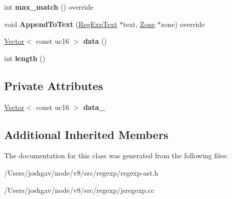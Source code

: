 \begin{DoxyCompactItemize}
\item 
int {\bfseries max\+\_\+match} () override\hypertarget{classv8_1_1internal_1_1_reg_exp_atom_ac030610f58e9dd3b4f26dbf6c4f599d7}{}\label{classv8_1_1internal_1_1_reg_exp_atom_ac030610f58e9dd3b4f26dbf6c4f599d7}

\item 
void {\bfseries Append\+To\+Text} (\hyperlink{classv8_1_1internal_1_1_reg_exp_text}{Reg\+Exp\+Text} $\ast$text, \hyperlink{classv8_1_1internal_1_1_zone}{Zone} $\ast$zone) override\hypertarget{classv8_1_1internal_1_1_reg_exp_atom_a7f46566fde6671d6e646caa80984e421}{}\label{classv8_1_1internal_1_1_reg_exp_atom_a7f46566fde6671d6e646caa80984e421}

\item 
\hyperlink{classv8_1_1internal_1_1_vector}{Vector}$<$ const uc16 $>$ {\bfseries data} ()\hypertarget{classv8_1_1internal_1_1_reg_exp_atom_ad5711a0a79d8952864b2d6fd61ab66c6}{}\label{classv8_1_1internal_1_1_reg_exp_atom_ad5711a0a79d8952864b2d6fd61ab66c6}

\item 
int {\bfseries length} ()\hypertarget{classv8_1_1internal_1_1_reg_exp_atom_a315e0291cf6e0b1487dfa2fe00dda91f}{}\label{classv8_1_1internal_1_1_reg_exp_atom_a315e0291cf6e0b1487dfa2fe00dda91f}

\end{DoxyCompactItemize}
\subsection*{Private Attributes}
\begin{DoxyCompactItemize}
\item 
\hyperlink{classv8_1_1internal_1_1_vector}{Vector}$<$ const uc16 $>$ {\bfseries data\+\_\+}\hypertarget{classv8_1_1internal_1_1_reg_exp_atom_a7e650f980216e353e13c01793bcf328e}{}\label{classv8_1_1internal_1_1_reg_exp_atom_a7e650f980216e353e13c01793bcf328e}

\end{DoxyCompactItemize}
\subsection*{Additional Inherited Members}


The documentation for this class was generated from the following files\+:\begin{DoxyCompactItemize}
\item 
/\+Users/joshgav/node/v8/src/regexp/regexp-\/ast.\+h\item 
/\+Users/joshgav/node/v8/src/regexp/jsregexp.\+cc\end{DoxyCompactItemize}
